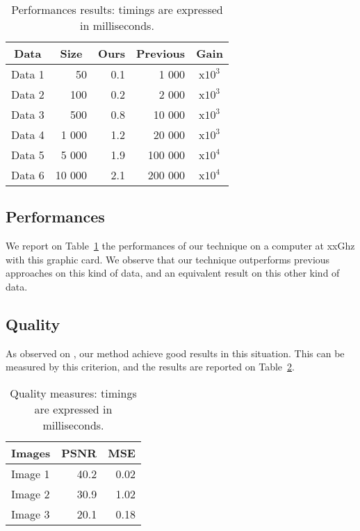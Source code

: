 \documentclass[10pt, conference]{IEEEtran}
\begin{document}
\begin{table}
\caption{Performances results: timings are expressed in milliseconds.}
\label{tab:perfs}
\centering
\begin{tabular}{lr|rr|c}
\multicolumn{1}{c}{\bf Data} &
\multicolumn{1}{c|}{\bf Size} &
\multicolumn{1}{c}{\bf Ours} &
\multicolumn{1}{c|}{\bf Previous} &
\multicolumn{1}{c}{\bf Gain} \\ \hline
Data 1	&        50 	& 0.1 &     1 000	& x$10^3$ \\
Data 2	&      100 	& 0.2 &     2 000	& x$10^3$ \\
Data 3	&      500 	& 0.8 &   10 000	& x$10^3$ \\
Data 4	&   1 000 	& 1.2 &   20 000	& x$10^3$ \\
Data 5	&   5 000 	& 1.9 & 100 000	& x$10^4$ \\
Data 6	& 10 000 	& 2.1 & 200 000	& x$10^4$
\end{tabular}
\end{table}
%
\subsection{Performances}
%
We report on Table~\ref{tab:perfs} the performances of our technique on a computer at xxGhz with this graphic card.
We observe that our technique outperforms previous approaches on this kind of data, and an equivalent result on this other kind of data.



\subsection{Quality}
%
As observed on , our method achieve good results in this situation. 
This can be measured by this criterion, and the results are reported on Table~\ref{tab:quality}.

\begin{table}
\caption{Quality measures: timings are expressed in milliseconds.}
\label{tab:quality}
\centering
\begin{tabular}{l|r|r}
\multicolumn{1}{c}{\bf Images} &
\multicolumn{1}{c|}{\bf PSNR} &
\multicolumn{1}{c}{\bf  MSE} \\ \hline
Image 1	&  40.2	& 0.02 \\
Image 2	&  30.9	& 1.02 \\
Image 3 &  20.1 & 0.18 \\
\end{tabular}
\end{table}
\end{document}
